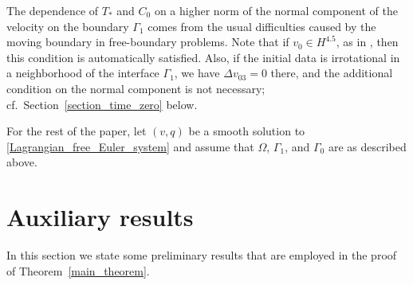 \documentclass[10pt,reqno]{amsart}
\theoremstyle{plain}
\theoremstyle{definition}
\newtheorem{assumption}[theorem]{Assumption}
\numberwithin{equation}{section}
\newcommand{\Ga}{\Gamma}
\newcommand{\Om}{\Omega}
\def\referee#1{{\color{green}\hbox{\bf ~#1~}}} %
\begin{document}


The dependence of $T_*$ and $C_0$ on a higher norm of the normal component
of the velocity on the boundary $\Ga_1$
comes from the usual difficulties caused by the moving boundary 
in free-boundary problems.
Note that if $v_0\in H^{4.5}$, as in
\cite{CoutandShkollerFreeBoundary, SchweizerFreeEuler},
then this condition is automatically satisfied.
Also, if the initial data is irrotational
in a neighborhood of the 
interface $\Gamma_1$, 
we have $\Delta v_{03}=0$  there, and
the additional condition on the normal component is not necessary;
cf.~Section~\ref{section_time_zero} below.


For the rest of the paper, 
let $(v,q)$  be
a smooth solution to \eqref{Lagrangian_free_Euler_system}
and assume that 
$\Om$, $\Ga_1$, and $\Ga_0$ are as described above.
%

\section{Auxiliary results}\label{section_aux}

In this section we state some preliminary results that are employed in the proof of 
Theorem~\ref{main_theorem}.
\end{document}

